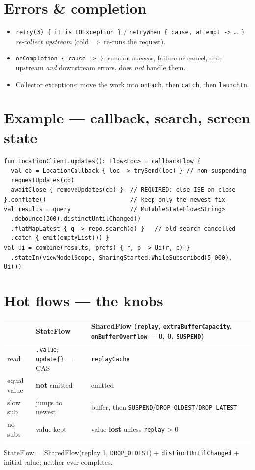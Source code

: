 \documentclass[8pt]{extarticle}
\newcommand\ar{\texttt{\hbox{-}\hbox{>}}}
\begin{document}
\begin{multicols}{2}
\section{Errors \& completion}
\begin{itemize}\raggedright
  \item \texttt{retry(3) \{ it is IOException \}} / \texttt{retryWhen \{ cause, attempt \ar\ … \}}
        \emph{re-collect upstream} (cold $\Rightarrow$ re-runs the request).
  \item \texttt{onCompletion \{ cause \ar\ \}}: runs on success, failure or cancel, sees
        upstream \emph{and} downstream errors, does \emph{not} handle them.
  \item Collector exceptions: move the work into \texttt{onEach}, then \texttt{catch},
        then \texttt{launchIn}.
\end{itemize}

\section{Example — callback, search, screen state}
\begin{lstlisting}[language=KotlinSheet]
fun LocationClient.updates(): Flow<Loc> = callbackFlow {
  val cb = LocationCallback { loc -> trySend(loc) } // non-suspending
  requestUpdates(cb)
  awaitClose { removeUpdates(cb) }  // REQUIRED: else ISE on close
}.conflate()                        // keep only the newest fix
val results = query                 // MutableStateFlow<String>
  .debounce(300).distinctUntilChanged()
  .flatMapLatest { q -> repo.search(q) }   // old search cancelled
  .catch { emit(emptyList()) }
val ui = combine(results, prefs) { r, p -> Ui(r, p) }
  .stateIn(viewModelScope, SharingStarted.WhileSubscribed(5_000), Ui())
\end{lstlisting}

\columnbreak

\section{Hot flows — the knobs}
{\scriptsize
\noindent\begin{tabularx}{\linewidth}{@{}>{\raggedright\arraybackslash}p{11mm}>{\raggedright\arraybackslash}p{26mm}L@{}}
\toprule
 & \textbf{StateFlow} & \textbf{SharedFlow} (\texttt{replay}, \texttt{extraBufferCapacity},
  \texttt{onBufferOverflow} = 0, 0, \texttt{SUSPEND}) \\
\midrule
read & \texttt{.value}; \texttt{update\{\}} = CAS & \texttt{replayCache} \\
equal value & \textbf{not} emitted & emitted \\
slow sub & jumps to newest & buffer, then \texttt{SUSPEND}/\texttt{DROP\_OLDEST}/\texttt{DROP\_LATEST} \\
no subs & value kept & value \textbf{lost} unless \texttt{replay} > 0 \\
\bottomrule
\end{tabularx}}
{\raggedright StateFlow = SharedFlow(replay 1, \texttt{DROP\_OLDEST}) + \texttt{distinctUntilChanged}
+ initial value; neither ever completes.\par}


\end{multicols}
\end{document}

